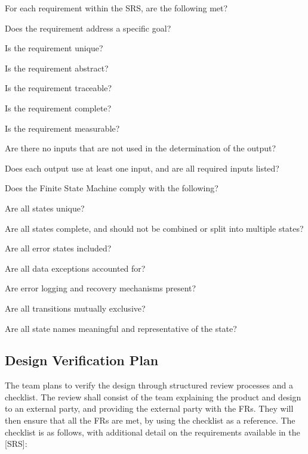 \documentclass[12pt, titlepage]{article}
\begin{document}
\begin{todolist}
\label{SRS_Checklist}
\item For each requirement within the SRS, are the following met?
\begin{todolist}
    \item Does the requirement address a specific goal?
    \item Is the requirement unique? 
    \item Is the requirement abstract?
    \item Is the requirement traceable?
    \item Is the requirement complete?
    \item Is the requirement measurable?
    \item Are there no inputs that are not used in the determination of the output? 
    \item Does each output use at least one input, and are all required inputs listed?
\end{todolist}
\item Does the Finite State Machine comply with the following?
\begin{todolist}
    \item Are all states unique?
    \item Are all states complete, and should not be combined or split into multiple states?
    \item Are all error states included?
    \begin{todolist}
        \item Are all data exceptions accounted for?
        \item Are error logging and recovery mechanisms present?
    \end{todolist}
    \item Are all transitions mutually exclusive?
    \item Are all state names meaningful and representative of the state?
\end{todolist}
\end{todolist}

\subsection{Design Verification Plan}

The team plans to verify the design through structured review processes and a checklist. The review shall consist of the team explaining the product and design to an external party, and providing the external party with the FRs. They will then ensure that all the FRs are met, by using the checklist as a reference. The checklist is as follows, with additional detail on the requirements available in the [SRS]: 
\end{document}

